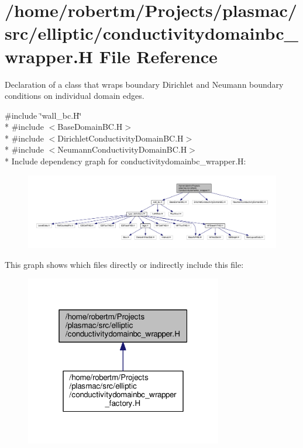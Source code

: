 \hypertarget{conductivitydomainbc__wrapper_8H}{}\section{/home/robertm/\+Projects/plasmac/src/elliptic/conductivitydomainbc\+\_\+wrapper.H File Reference}
\label{conductivitydomainbc__wrapper_8H}


Declaration of a class that wraps boundary Dirichlet and Neumann boundary conditions on individual domain edges.  


{\ttfamily \#include \char`\"{}wall\+\_\+bc.\+H\char`\"{}}\\*
{\ttfamily \#include $<$Base\+Domain\+B\+C.\+H$>$}\\*
{\ttfamily \#include $<$Dirichlet\+Conductivity\+Domain\+B\+C.\+H$>$}\\*
{\ttfamily \#include $<$Neumann\+Conductivity\+Domain\+B\+C.\+H$>$}\\*
Include dependency graph for conductivitydomainbc\+\_\+wrapper.\+H\+:\nopagebreak
\begin{figure}[H]
\begin{center}
\leavevmode
\includegraphics[width=350pt]{conductivitydomainbc__wrapper_8H__incl}
\end{center}
\end{figure}
This graph shows which files directly or indirectly include this file\+:\nopagebreak
\begin{figure}[H]
\begin{center}
\leavevmode
\includegraphics[width=244pt]{conductivitydomainbc__wrapper_8H__dep__incl}
\end{center}
\end{figure}
